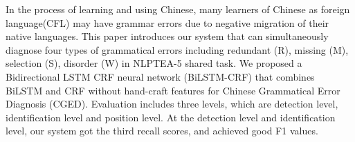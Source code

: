 In the process of learning and using Chinese, many learners of Chinese as foreign language(CFL) may have grammar errors due to negative migration of their native languages. This paper introduces our system that can simultaneously diagnose four types of grammatical errors including redundant (R), missing (M), selection (S), disorder (W) in NLPTEA-5 shared task. We proposed a Bidirectional LSTM CRF neural network (BiLSTM-CRF) that combines BiLSTM and CRF without hand-craft features for Chinese Grammatical Error Diagnosis (CGED). Evaluation includes three levels, which are detection level, identification level and position level. At the detection level and identification level, our system got the third recall scores, and achieved good F1 values.
